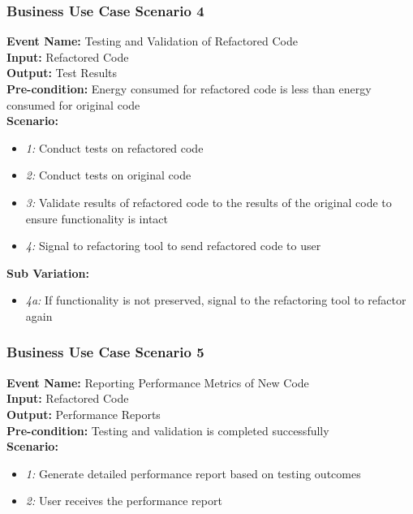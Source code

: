 \documentclass[12pt]{article}
\begin{document}
\subsubsection{Business Use Case Scenario 4} 
\textbf{Event Name:} Testing and Validation of Refactored Code \\
\textbf{Input:} Refactored Code \\
\textbf{Output:} Test Results \\
\textbf{Pre-condition:} Energy consumed for refactored code is less than energy consumed for original code \\
\textbf{Scenario: } \\
\begin{itemize}
    \item \textit{1:} Conduct tests on refactored code
    \item \textit{2:} Conduct tests on original code
    \item \textit{3:} Validate results of refactored code to the results of the original code to ensure functionality is intact
    \item \textit{4:} Signal to refactoring tool to send refactored code to user
\end{itemize}
\textbf{Sub Variation: }
\begin{itemize}
    \item \textit{4a:} If functionality is not preserved, signal to the refactoring tool to refactor again
\end{itemize}

\subsubsection{Business Use Case Scenario 5} 
\textbf{Event Name:} Reporting Performance Metrics of New Code \\
\textbf{Input:} Refactored Code \\
\textbf{Output:} Performance Reports\\
\textbf{Pre-condition:} Testing and validation is completed successfully \\
\textbf{Scenario: } \\
\begin{itemize}
    \item \textit{1:} Generate detailed performance report based on testing outcomes
    \item \textit{2:} User receives the performance report
\end{itemize}
\end{document}
